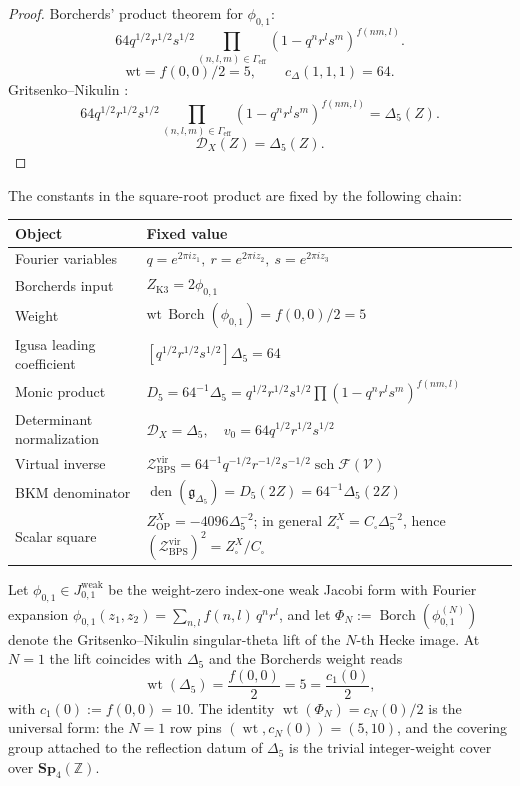 \documentclass[11pt]{memoir}
\newcommand{\Z}{\mathbb{Z}} \newcommand{\C}{\mathbb{C}}
\newcommand{\Sp}{\mathbf{Sp}}
\newcommand{\sch}{\operatorname{sch}}
\newcommand{\autcor}{\mathfrak{g}_{\Delta_5}}
\begin{document}
\begin{proof}
Borcherds' product theorem for $\phi_{0,1}$:
$$64q^{1/2}r^{1/2}s^{1/2}
\prod_{(n,l,m)\in\Gamma_{\mathrm{eff}}}
(1-q^nr^ls^m)^{f(nm,l)}.$$
$$\mathrm{wt}=f(0,0)/2=5,\qquad c_\Delta(1,1,1)=64.$$
Gritsenko--Nikulin \cite{GN}:
$$64q^{1/2}r^{1/2}s^{1/2}
\prod_{(n,l,m)\in\Gamma_{\mathrm{eff}}}(1-q^nr^ls^m)^{f(nm,l)}
=\Delta_5(Z).$$
$$\mathcal D_X(Z)=\Delta_5(Z).$$
\end{proof}

\begin{remark}
The constants in the square-root product are fixed by the following
chain:
\begin{center}
\small
\begin{tabular}{p{}p{}}
\hline
Object & Fixed value \\
\hline
Fourier variables &
\(q=e^{2\pi iz_1},\ r=e^{2\pi iz_2},\ s=e^{2\pi iz_3}\) \\
Borcherds input &
\(Z_{\mathrm{K3}}=2\phi_{0,1}\) \\
Weight &
\(\mathrm{wt}\,\operatorname{Borch}(\phi_{0,1})=f(0,0)/2=5\) \\
Igusa leading coefficient &
\([q^{1/2}r^{1/2}s^{1/2}]\Delta_5=64\) \\
Monic product &
\(D_5=64^{-1}\Delta_5
=q^{1/2}r^{1/2}s^{1/2}\prod(1-q^nr^ls^m)^{f(nm,l)}\) \\
Determinant normalization &
\(\mathcal D_X=\Delta_5,\quad
v_0=64q^{1/2}r^{1/2}s^{1/2}\) \\
Virtual inverse &
\(\mathcal Z_{\mathrm{BPS}}^{\mathrm{vir}}
=64^{-1}q^{-1/2}r^{-1/2}s^{-1/2}\sch\mathcal F(\mathcal V)\) \\
BKM denominator &
\(\operatorname{den}(\autcor)=D_5(2Z)=64^{-1}\Delta_5(2Z)\) \\
Scalar square &
\(Z^X_{\mathrm{OP}}=-4096\Delta_5^{-2}\);
in general \(Z^X_{\square}=C_{\square}\Delta_5^{-2}\), hence
\((\mathcal Z_{\mathrm{BPS}}^{\mathrm{vir}})^2=Z^X_{\square}/C_{\square}\) \\
\hline
\end{tabular}
\end{center}
\end{remark}

\begin{proposition}[Universal Borcherds--Gritsenko weight identity at $N=1$]
Let $\phi_{0,1}\in J_{0,1}^{\mathrm{weak}}$ be the weight-zero index-one
weak Jacobi form with Fourier expansion
$\phi_{0,1}(z_1,z_2)=\sum_{n,l}f(n,l)\,q^nr^l$, and let
$\Phi_N:=\operatorname{Borch}(\phi_{0,1}^{(N)})$ denote the
Gritsenko--Nikulin singular-theta lift of the $N$-th Hecke image.  At
$N=1$ the lift coincides with $\Delta_5$ and the Borcherds weight
reads
$$\operatorname{wt}(\Delta_5)=\frac{f(0,0)}{2}=5=\frac{c_1(0)}{2},$$
with $c_1(0):=f(0,0)=10$.  The identity $\operatorname{wt}(\Phi_N)=c_N(0)/2$
is the universal form: the $N=1$ row pins
$(\operatorname{wt},c_N(0))=(5,10)$, and the covering group attached to
the reflection datum of $\Delta_5$ is the trivial integer-weight cover
over $\Sp_4(\Z)$.
\end{proposition}
\end{document}
